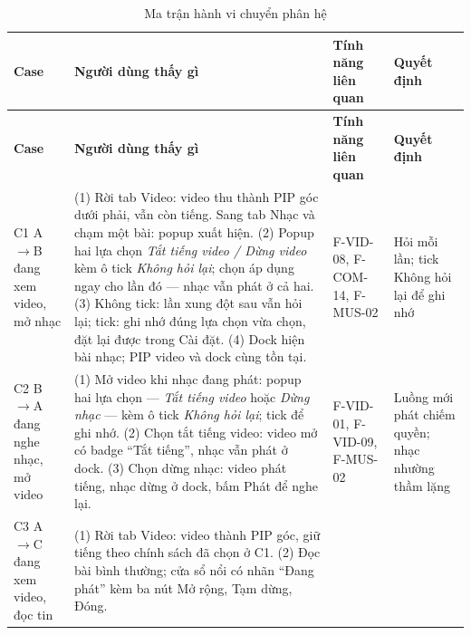 \begin{longtable}{>{\raggedright\arraybackslash}p{1.5cm} >{\raggedright\arraybackslash}p{8.6cm} >{\raggedright\arraybackslash}p{2.5cm} >{\raggedright\arraybackslash}p{2.6cm}}
\caption{Ma trận hành vi chuyển phân hệ}
\label{tab:switch-matrix}\\
\toprule
\textbf{Case} & \textbf{Người dùng thấy gì} & \textbf{Tính năng liên quan} & \textbf{Quyết định} \\
\midrule
\endfirsthead
\toprule
\textbf{Case} & \textbf{Người dùng thấy gì} & \textbf{Tính năng liên quan} & \textbf{Quyết định} \\
\midrule
\endhead
\bottomrule
\endfoot
C1 \newline A$\rightarrow$B \newline đang xem video, mở nhạc &
(1) Rời tab Video: video thu thành PIP góc dưới phải, vẫn còn tiếng. Sang tab Nhạc và chạm một bài: popup xuất hiện. \newline
(2) Popup hai lựa chọn \textit{Tắt tiếng video / Dừng video} kèm ô tick \textit{Không hỏi lại}; chọn áp dụng ngay cho lần đó — nhạc vẫn phát ở cả hai. \newline
(3) Không tick: lần xung đột sau vẫn hỏi lại; tick: ghi nhớ đúng lựa chọn vừa chọn, đặt lại được trong Cài đặt. \newline
(4) Dock hiện bài nhạc; PIP video và dock cùng tồn tại. &
F-VID-08, F-COM-14, F-MUS-02 &
Hỏi mỗi lần; tick Không hỏi lại để ghi nhớ \\
\midrule
C2 \newline B$\rightarrow$A \newline đang nghe nhạc, mở video &
(1) Mở video khi nhạc đang phát: popup hai lựa chọn --- \textit{Tắt tiếng video} hoặc \textit{Dừng nhạc} --- kèm ô tick \textit{Không hỏi lại}; tick để ghi nhớ. \newline
(2) Chọn tắt tiếng video: video mở có badge ``Tắt tiếng'', nhạc vẫn phát ở dock. \newline
(3) Chọn dừng nhạc: video phát tiếng, nhạc dừng ở dock, bấm Phát để nghe lại. &
F-VID-01, F-VID-09, F-MUS-02 &
Luồng mới phát chiếm quyền; nhạc nhường thầm lặng \\
\midrule
C3 \newline A$\rightarrow$C \newline đang xem video, đọc tin &
(1) Rời tab Video: video thành PIP góc, giữ tiếng theo chính sách đã chọn ở C1. \newline
(2) Đọc bài bình thường; cửa sổ nổi có nhãn ``Đang phát'' kèm ba nút Mở rộng, Tạm dừng, Đóng. \newline

\end{longtable}
